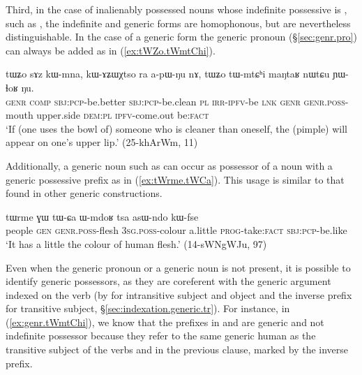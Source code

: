 Third, in the case of inalienably possessed nouns whose indefinite possessive is , such as , the indefinite and generic forms are homophonous, but are nevertheless distinguishable. In the case of a generic form the generic pronoun  (§\ref{sec:genr.pro}) can always be added as in (\ref{ex:tWZo.tWmtChi}). 

\begin{exe}
\ex  \label{ex:tWZo.tWmtChi}
\gll tɯʑo sɤz kɯ-mna, kɯ-ɤʑɯχtso ra a-pɯ-ŋu nɤ,  tɯʑo tɯ-mtɕʰi maŋtaʁ nɯtɕu ɲɯ-ɬoʁ ŋu. \\
\textsc{genr} \textsc{comp} \textsc{sbj}:\textsc{pcp}-be.better \textsc{sbj}:\textsc{pcp}-be.clean \textsc{pl} \textsc{irr}-\textsc{ipfv}-be \textsc{lnk}  \textsc{genr} \textsc{genr}.\textsc{poss}-mouth upper.side \textsc{dem}:\textsc{pl} \textsc{ipfv}-come.out be:\textsc{fact} \\
\glt `If (one uses the bowl of) someone who is cleaner than oneself, the (pimple) will appear on one's upper lip.' (25-khArWm, 11)
\end{exe}

Additionally, a generic noun such as  can occur as possessor of a noun with a generic possessive prefix as in (\ref{ex:tWrme.tWCa}). This usage is similar to that found in other generic constructions.

\begin{exe}
\ex  \label{ex:tWrme.tWCa}
\gll tɯrme ɣɯ tɯ-ɕa ɯ-mdoʁ tsa asɯ-ndo kɯ-fse \\
people \textsc{gen} \textsc{genr}.\textsc{poss}-flesh \textsc{3sg}.\textsc{poss}-colour a.little \textsc{prog}-take:\textsc{fact} \textsc{sbj}:\textsc{pcp}-be.like \\
\glt `It has a little the colour of human flesh.' (14-sWNgWJu, 97)
\end{exe}

Even when the generic pronoun or a generic noun is not present, it is possible to identify generic possessors, as they are coreferent with the generic argument indexed on the verb (by  for intransitive subject and object and the inverse prefix  for transitive subject, §\ref{sec:indexation.generic.tr}). For instance, in (\ref{ex:genr.tWmtChi}), we know that  the  prefixes in  and   are generic and not indefinite possessor because they refer to the same generic human as the transitive subject of the verbs  and  in the previous clause, marked by the inverse prefix.

